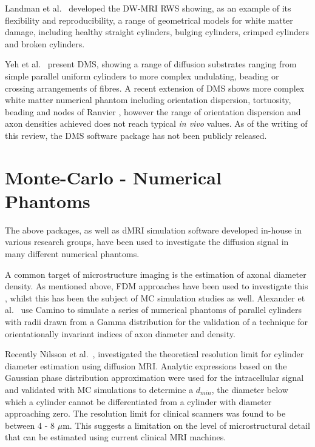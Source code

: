 Landman et al.\ \cite{Landman2010} developed the DW-MRI \ac{RWS} showing, as an example of its flexibility and reproducibility, a range of geometrical models for white matter damage, including healthy straight cylinders, bulging cylinders, crimped cylinders and broken cylinders.

Yeh et al.\ \cite{Yeh2013} present \ac{DMS}, showing a range of diffusion substrates ranging from simple parallel uniform cylinders to more complex undulating, beading or crossing arrangements of fibres.
A recent extension of \ac{DMS} shows more complex white matter numerical phantom including orientation dispersion, tortuosity, beading and nodes of Ranvier \cite{Ginsburger2018}, however the range of orientation dispersion and axon densities achieved does not reach typical \emph{in vivo} values.
As of the writing of this review, the \ac{DMS} software package has not been publicly released. 

\section{Monte-Carlo - Numerical Phantoms}
\label{sec:app_monte_carlo_numerical_phantoms}
The above packages, as well as \ac{dMRI} simulation software developed in-house in various research groups, have been used to investigate the diffusion signal in many different numerical phantoms. 

A common target of microstructure imaging is the estimation of axonal diameter density.
As mentioned above, \ac{FDM} approaches have been used to investigate this \cite{Chin2002,Xu2014}, whilst this has been the subject of \ac{MC} simulation studies as well.
Alexander et al.\ \cite{Alexander2010} use Camino to simulate a series of numerical phantoms of parallel cylinders with radii drawn from a Gamma distribution for the validation of a technique for orientationally invariant indices of axon diameter and density.

Recently Nilsson et al.\ \cite{Nilsson2017}, investigated the theoretical resolution limit for cylinder diameter estimation using diffusion MRI. Analytic expressions based on the Gaussian phase distribution approximation \cite{Price1997} were used for the intracellular signal and validated with \ac{MC} simulations to determine a $d_{min}$, the diameter below which a cylinder cannot be differentiated from a cylinder with diameter approaching zero. The resolution limit for clinical scanners was found to be between 4 - 8 $\mu$m.
This suggests a limitation on the level of microstructural detail that can be estimated using current clinical \ac{MRI} machines.

